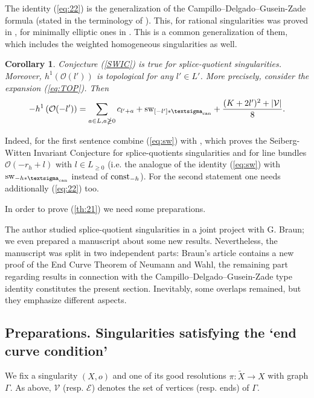 \documentclass[10pt,a4paper]{amsart}
\numberwithin{equation}{section}
\numberwithin{equation}{subsection}
\theoremstyle{plain}
\newtheorem{corollary}[equation]{Corollary}
\theoremstyle{definition}
\begin{document}
The identity (\ref{eq:22}) is the generalization of the
Campillo--Delgado--Gusein-Zade formula (stated in the terminology
of \cite{CDGb}). This, for rational singularities was proved in
\cite{CDGEq}, for minimally elliptic ones in \cite{CDGb}. This is
a common generalization of them, which includes the weighted
homogeneous singularities as well.

\begin{corollary}\label{cor:QS} Conjecture (\ref{SWIC}) is true
for splice-quotient singularities. Moreover, $h^1({\mathcal{O}}(l'))$ is topological 
for any $l'\in L'$. More precisely, consider the expansion (\ref{eq:TOP}).
Then
\begin{equation}\label{eq:24}
   - h^1 \left( {\mathcal{O}}(-l')\right) = \sum_{a \in L, a \ngeq 0}
    c_{l'+a} + {\operatorname{sw}\sb{{[-l']*{\textsigma}_{\mathrm{can}}}}} +
    {\mathchoice
         \frac{{(K + 2 l')^2 + |{\mathcal{V}}|}}{{8}}   
  {\mathinner{{{(K + 2 l')^2 + |{\mathcal{V}}|}}/{{8}}}}
  {\mathinner{{{(K + 2 l')^2 + |{\mathcal{V}}|}}/{{8}}}}
  {\mathinner{{{(K + 2 l')^2 + |{\mathcal{V}}|}}/{{8}}}}
}.
  \end{equation}
\end{corollary}
Indeed, for the first sentence  combine  (\ref{eq:sw})  with
\cite[(2.2.4)]{BN}, which proves the
Seiberg-Witten Invariant Conjecture for splice-quotients
singularities and for line bundles ${\mathcal{O}}(-r_h+l)$ with $l\in
L_{\geq 0}$ (i.e. the analogue of the identity (\ref{eq:sw}) with
${\operatorname{sw}\sb{{-h*{\textsigma}_{{\rm can}}}}}$ instead of ${\rm const}_{-h}$). 
For the second statement  one needs additionally (\ref{eq:22}) too.

In order to prove (\ref{th:21}) we need some preparations.

The author studied splice-quotient singularities in a joint
project with G. Braun; we even prepared a manuscript about some
new results. Nevertheless, the manuscript was split in two
independent parts: Braun's article \cite{Gabor} contains a new
proof of the End Curve Theorem of Neumann and Wahl,  the remaining
part regarding results in connection with the
Campillo--Delgado--Gusein-Zade type identity constitutes the
present section. Inevitably, some overlaps remained, but they
emphasize different aspects.

\subsection{Preparations. Singularities satisfying the `end curve condition'}\label{ECC}
We fix a singularity $(X,o)$ and one of its good resolutions
$\pi:\widetilde{X}\to X$ with graph $\Gamma$. As above, ${\mathcal{V}}$
(resp. ${\mathcal{E}}$) denotes the set of vertices (resp. ends) of
$\Gamma$.
\end{document}
